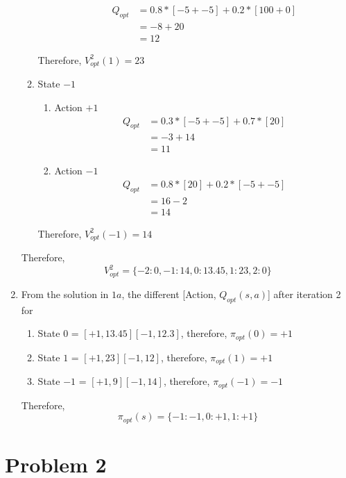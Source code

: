\documentclass[12pt]{article}
\begin{document}
\begin{enumerate}[label=(\alph*)]
\begin{enumerate}
\begin{enumerate}
			\begin{align*}
				Q_{opt} &= 0.8 * [-5 + -5] + 0.2 * [100 + 0] \\
				&= -8 + 20 \\
				&= 12
			\end{align*}
	\end{enumerate}
	Therefore, $V_{opt}^2(1) = 23$
\item State $-1$
	\begin{enumerate}
		\item Action $+1$
			\begin{align*}
				Q_{opt} &= 0.3 * [-5 + -5] + 0.7 * [20] \\
				&= -3 + 14 \\
				&= 11
			\end{align*}
		\item Action $-1$
			\begin{align*}
				Q_{opt} &= 0.8 * [20] + 0.2 * [-5 + -5] \\
				&= 16 - 2 \\
				&= 14
			\end{align*}
	\end{enumerate}
	Therefore, $V_{opt}^2(-1) = 14$
 \end{enumerate}
 Therefore, $$V_{opt}^2 = \{ -2: 0, -1: 14, 0: 13.45, 1: 23, 2: 0\}$$
  \item From the solution in $1a$, the different [Action, $Q_{opt}(s,a)$] after iteration 2 for
  	\begin{enumerate}
  		\item State $0$ = $[+1, 13.45] [-1, 12.3]$, therefore, $\pi_{opt}(0) = +1$
  		\item State $1$ = $[+1, 23] [-1, 12]$, therefore, $\pi_{opt}(1) = +1$
  		\item State $-1$ = $[+1, 9] [-1, 14]$, therefore, $\pi_{opt}(-1) = -1$
  	\end{enumerate}
  	Therefore, $$\pi_{opt}(s) = \{ -1: -1, 0: +1, 1: +1 \}$$
\end{enumerate}

\section*{Problem 2}
\end{document}
